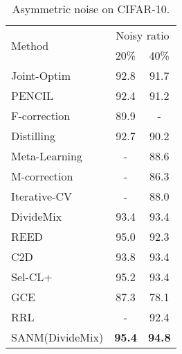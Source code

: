 \documentclass[10pt,twocolumn,letterpaper]{article}
\begin{document}
\begin{table*}[t]
\begin{minipage}{0.66\linewidth}
\begin{minipage}{0.47\linewidth}
    \footnotesize
    \caption{Asymmetric noise on CIFAR-10.}
    \vspace{-1em}
    \centering
    \renewcommand{\arraystretch}{1.1}
    {\begin{tabular}{p{2.4cm}|cc}
        \hline
        \multirow{2}{*}{Method}  & \multicolumn{2}{c}{Noisy ratio} \\ \cline{2-3} 
        & 20\% & 40\% \\ \hline
        Joint-Optim\cite{tanaka2018joint}              & 92.8    & 91.7 \\ 
        
        PENCIL~\cite{yi2019probabilistic}                & 92.4   & 91.2 \\ 
        F-correction~\cite{patrini2017making}            & 89.9    & - \\
        Distilling~\cite{zhang2020distilling}          & 92.7    & 90.2 \\
Meta-Learning~\cite{MLNT}                         &  -      & 88.6 \\ 
        M-correction~\cite{arazo2019unsupervised}        &  -      & 86.3 \\ 
        Iterative-CV~\cite{chen2019understanding}        &  -      & 88.0 \\ 
        DivideMix~\cite{li2020dividemix}     & 93.4    & 93.4 \\ 
        REED ~\cite{zhang2020decoupling}                 & {95.0}    & {92.3}    \\
        C2D ~\cite{zheltonozhskii2022contrast}                 & {93.8}    & {93.4}    \\
        Sel-CL+ ~\cite{li2022selective}                 & 95.2    & {93.4}    \\
        GCE ~\cite{ghosh2021contrastive}                 & {87.3}    & {78.1}    \\
        RRL ~\cite{li2021learning}                 & -    & {92.4}    \\        
        \hline
        SANM(DivideMix)                                            & \textbf{95.4}    & \textbf{94.8}    \\
        \hline
    \end{tabular}}
    \label{tab:cifar10asy}
    

\end{minipage}
\end{minipage}
\end{table*}
\end{document}
